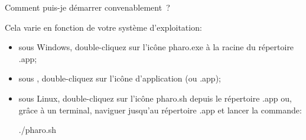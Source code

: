 \documentclass[a4paper,10pt,twoside]{book}
\begin{document}
\begin{faq} %
Comment puis-je démarrer \pharo{} convenablement~?
\end{faq}
\answer
Cela varie en fonction de votre système d'exploitation:
\begin{itemize}
\item sous Windows, double-cliquez sur l'icône \textsf{pharo.exe} à la racine du répertoire \textsf{\pharooneclick{}.app};
\item sous \macosx{}, double-cliquez sur l'icône d'application \textsf{\pharooneclick} (ou \textsf{\pharooneclick{}.app});
\item sous Linux, double-cliquez sur l'icône \textsf{pharo.sh} depuis le répertoire \textsf{\pharooneclick{}.app} ou, grâce à un terminal, naviguer jusqu'au répertoire \textsf{\pharooneclick{}.app} et lancer la commande:
\begin{code}{}
./pharo.sh
\end{code}
\end{itemize}
\end{document}
